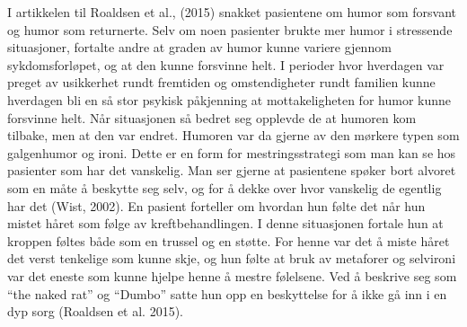 I artikkelen til Roaldsen et al., (2015) snakket pasientene om humor som
forsvant og humor som returnerte. Selv om noen pasienter brukte mer humor i
stressende situasjoner, fortalte andre at graden av humor kunne variere gjennom
sykdomsforløpet, og at den kunne forsvinne helt. I perioder hvor hverdagen var
preget av usikkerhet rundt fremtiden og omstendigheter rundt familien kunne
hverdagen bli en så stor psykisk påkjenning at mottakeligheten for humor kunne
forsvinne helt. Når situasjonen så bedret seg opplevde de at humoren kom
tilbake, men at den var endret. Humoren var da gjerne av den mørkere typen som
galgenhumor og ironi.  Dette er en form for mestringsstrategi som man kan se
hos pasienter som har det vanskelig. Man ser gjerne at pasientene spøker bort
alvoret som en måte å beskytte seg selv, og for å dekke over hvor vanskelig de
egentlig har det (Wist, 2002). En pasient forteller om hvordan hun følte det
når hun mistet håret som følge av kreftbehandlingen. I denne situasjonen
fortale hun at kroppen føltes både som en trussel og en støtte. For henne var
det å miste håret det verst tenkelige som kunne skje, og hun følte at bruk av
metaforer og selvironi var det eneste som kunne hjelpe henne å mestre
følelsene. Ved å beskrive seg som “the naked rat” og “Dumbo” satte hun opp en
beskyttelse for å ikke gå inn i en dyp sorg (Roaldsen et al. 2015).

